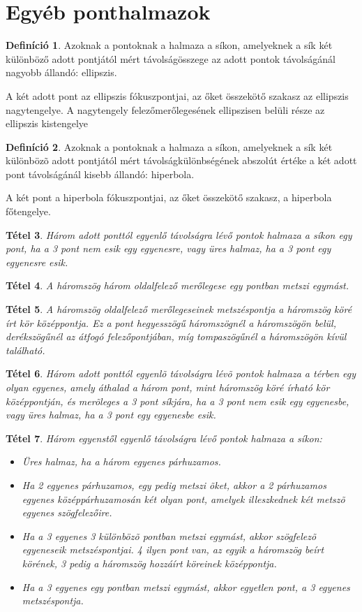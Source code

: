 \documentclass[twoside,12pt]{report}
\newtheorem{theorem}{Tétel}[section]
\theoremstyle{definition}
\newtheorem{definition}[theorem]{Definíció}
\begin{document}
\section{Egyéb ponthalmazok}
	\begin{definition}
		Azoknak a pontoknak a halmaza a síkon, amelyeknek a sík két különböző adott pontjától
		mért távolságösszege az adott pontok távolságánál nagyobb állandó: ellipszis.
	\end{definition}
	A két adott pont az ellipszis fókuszpontjai, az őket összekötő szakasz az ellipszis nagytengelye. A nagytengely felezőmerőlegesének ellipszisen belüli része az ellipszis kistengelye
	\begin{definition}
		Azoknak a pontoknak a halmaza a síkon, amelyeknek a sík két különbözõ adott pontjától
		mért távolságkülönbségének abszolút értéke a két adott pont távolságánál kisebb állandó:
		hiperbola.
	\end{definition}
	A két pont a hiperbola fókuszpontjai, az őket összekötő szakasz, a hiperbola főtengelye.
	\begin{theorem}
		Három adott ponttól egyenlő távolságra lévő pontok halmaza a síkon egy pont, ha a 3 pont
		nem esik egy egyenesre, vagy üres halmaz, ha a 3 pont egy egyenesre esik.
	\end{theorem}
	\begin{theorem}
		A háromszög három oldalfelező merőlegese egy pontban metszi egymást.
	\end{theorem}
	\begin{theorem}
	A háromszög oldalfelező merőlegeseinek metszéspontja a háromszög köré írt kör középpontja.	Ez a pont hegyesszögű háromszögnél a háromszögön belül, derékszögűnél az átfogó felezőpontjában, míg tompaszögűnél a háromszögön kívül található.
	\end{theorem}
	\begin{theorem}
		Három adott ponttól egyenlõ távolságra lévõ pontok halmaza a térben egy olyan egyenes,
		amely áthalad a három pont, mint háromszög köré írható kör középpontján, és merõleges
		a 3 pont síkjára, ha a 3 pont nem esik egy egyenesbe, vagy üres halmaz, ha a 3 pont egy
		egyenesbe esik.
	\end{theorem}
	\begin{theorem}
		Három egyenstől egyenlő távolságra lévő pontok halmaza a síkon:
		\begin{itemize}
			\item Üres halmaz, ha a három egyenes párhuzamos.
			\item Ha 2 egyenes párhuzamos, egy pedig metszi õket, akkor a 2 párhuzamos egyenes középpárhuzamosán két olyan pont, amelyek illeszkednek két metszõ egyenes szögfelezőire.
			\item Ha a 3 egyenes 3 különbözõ pontban metszi egymást, akkor szögfelezõ egyeneseik metszéspontjai. 4 ilyen pont van, az egyik a háromszög beírt körének, 3 pedig a háromszög hozzáírt köreinek középpontja.
			\item Ha a 3 egyenes egy pontban metszi egymást, akkor egyetlen pont, a 3 egyenes metszéspontja.
		\end{itemize}
	\end{theorem}
\end{document}
